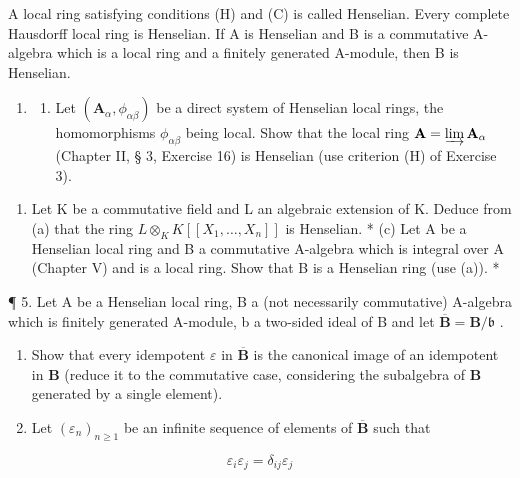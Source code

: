 A local ring satisfying conditions (H) and (C) is called Henselian. Every complete Hausdorff local ring is Henselian. If A is Henselian and B is a commutative A-algebra which is a local ring and a finitely generated A-module, then B is Henselian.

\begin{enumerate}
\def\labelenumi{\arabic{enumi}.}
\setcounter{enumi}{3}
\tightlist
\item
  \begin{enumerate}
  \def\labelenumii{(\alph{enumii})}
  \tightlist
  \item
    Let \((\mathbf{A}_{\alpha}, \phi_{\alpha \beta})\) be a direct system of Henselian local rings, the homomorphisms \(\phi_{\alpha \beta}\) being local. Show that the local ring \(\mathbf{A} = \varinjlim \mathbf{A}_{\alpha}\) (Chapter II, § 3, Exercise 16) is Henselian (use criterion (H) of Exercise 3).
  \end{enumerate}
\end{enumerate}

\begin{enumerate}
\def\labelenumi{(\alph{enumi})}
\setcounter{enumi}{1}
\tightlist
\item
  Let K be a commutative field and L an algebraic extension of K. Deduce from (a) that the ring \(L \otimes_{K} K[[X_{1}, \ldots, X_{n}]]\) is Henselian. * (c) Let A be a Henselian local ring and B a commutative A-algebra which is integral over A (Chapter V) and is a local ring. Show that B is a Henselian ring (use (a)). *
\end{enumerate}

¶ 5. Let A be a Henselian local ring, B a (not necessarily commutative) A-algebra which is finitely generated A-module, b a two-sided ideal of B and let \(\overline{\mathbf{B}} = \mathbf{B} / \mathfrak{b}\) .

\begin{enumerate}
\def\labelenumi{(\alph{enumi})}
\item
  Show that every idempotent \(\varepsilon\) in \(\overline{\mathbf{B}}\) is the canonical image of an idempotent in \(\mathbf{B}\) (reduce it to the commutative case, considering the subalgebra of \(\mathbf{B}\) generated by a single element).
\item
  Let \((\varepsilon_{n})_{n\geqslant 1}\) be an infinite sequence of elements of \(\overline{\mathbf{B}}\) such that
\end{enumerate}

\[
\varepsilon_ {i} \varepsilon_ {j} = \delta_ {i j} \varepsilon_ {j}
\]

